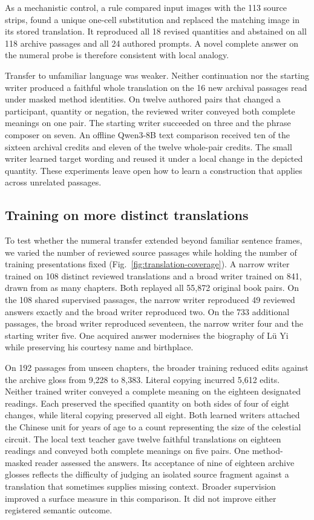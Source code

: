 \documentclass[12pt,a4paper]{article}
\providecommand{\DIFadd}[1]{{\protect\color{blue} \sf #1}} %
\begin{document}
\DIFadd{As a mechanistic control, a rule compared input images with the 113 source strips, found a unique one-cell substitution and replaced the matching image in its stored translation. It reproduced all 18 revised quantities and abstained on all 118 archive passages and all 24 authored prompts. A novel complete answer on the numeral probe is therefore consistent with local analogy.
}

\DIFadd{Transfer to unfamiliar language was weaker. Neither continuation nor the starting writer produced a faithful whole translation on the 16 new archival passages read under masked method identities. On twelve authored pairs that changed a participant, quantity or negation, the reviewed writer conveyed both complete meanings on one pair. The starting writer succeeded on three and the phrase composer on seven. An offline Qwen3-8B text comparison received ten of the sixteen archival credits and eleven of the twelve whole-pair credits. The small writer learned target wording and reused it under a local change in the depicted quantity. These experiments leave open how to learn a construction that applies across unrelated passages.
}

\subsection*{\DIFadd{Training on more distinct translations}}
\DIFadd{To test whether the numeral transfer extended beyond familiar sentence frames, we varied the number of reviewed source passages while holding the number of training presentations fixed (Fig.~\ref{fig:translation-coverage}). A narrow writer trained on 108 distinct reviewed translations and a broad writer trained on 841, drawn from as many chapters. Both replayed all 55,872 original book pairs. On the 108 shared supervised passages, the narrow writer reproduced 49 reviewed answers exactly and the broad writer reproduced two. On the 733 additional passages, the broad writer reproduced seventeen, the narrow writer four and the starting writer five. One acquired answer modernises the biography of L\"u Yi while preserving his courtesy name and birthplace.
}

\DIFadd{On 192 passages from unseen chapters, the broader training reduced edits against the archive gloss from 9,228 to 8,383. Literal copying incurred 5,612 edits. Neither trained writer conveyed a complete meaning on the eighteen designated readings. Each preserved the specified quantity on both sides of four of eight changes, while literal copying preserved all eight. Both learned writers attached the Chinese unit for years of age to a count representing the size of the celestial circuit. The local text teacher gave twelve faithful translations on eighteen readings and conveyed both complete meanings on five pairs. One method-masked reader assessed the answers. Its acceptance of nine of eighteen archive glosses reflects the difficulty of judging an isolated source fragment against a translation that sometimes supplies missing context. Broader supervision improved a surface measure in this comparison. It did not improve either registered semantic outcome.
}
\end{document}
